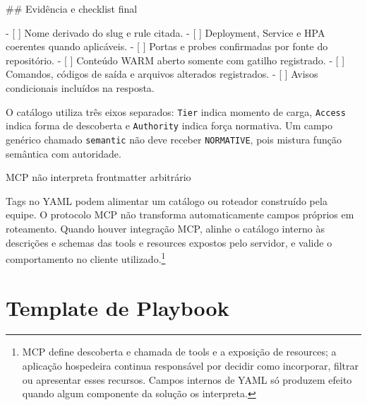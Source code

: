 \documentclass[
  10pt,
  a4paper,
  oneside]{book}
\newenvironment{Shaded}{}{}
\newcommand{\FunctionTok}[1]{\textcolor[rgb]{0.02,0.16,0.49}{#1}}
\newcommand{\NormalTok}[1]{#1}
\newcommand{\SpecialStringTok}[1]{\textcolor[rgb]{0.73,0.40,0.53}{#1}}
\newcommand{\VariableTok}[1]{\textcolor[rgb]{0.10,0.09,0.49}{#1}}
\begin{document}
\begin{Shaded}
\begin{Highlighting}[]
\FunctionTok{\#\# Evidência e checklist final}

\SpecialStringTok{{-} }\VariableTok{[ ]}\NormalTok{ Nome derivado do slug e rule citada.}
\SpecialStringTok{{-} }\VariableTok{[ ]}\NormalTok{ Deployment, Service e HPA coerentes quando aplicáveis.}
\SpecialStringTok{{-} }\VariableTok{[ ]}\NormalTok{ Portas e probes confirmadas por fonte do repositório.}
\SpecialStringTok{{-} }\VariableTok{[ ]}\NormalTok{ Conteúdo WARM aberto somente com gatilho registrado.}
\SpecialStringTok{{-} }\VariableTok{[ ]}\NormalTok{ Comandos, códigos de saída e arquivos alterados registrados.}
\SpecialStringTok{{-} }\VariableTok{[ ]}\NormalTok{ Avisos condicionais incluídos na resposta.}
\end{Highlighting}
\end{Shaded}

O catálogo utiliza três eixos separados: \texttt{Tier} indica momento de
carga, \texttt{Access} indica forma de descoberta e \texttt{Authority}
indica força normativa. Um campo genérico chamado \texttt{semantic} não
deve receber \texttt{NORMATIVE}, pois mistura função semântica com
autoridade.

\begin{warningbox}{MCP não interpreta frontmatter arbitrário}

Tags no YAML podem alimentar um catálogo ou roteador construído pela
equipe. O protocolo MCP não transforma automaticamente campos próprios
em roteamento. Quando houver integração MCP, alinhe o catálogo interno
às descrições e schemas das tools e resources expostos pelo servidor, e
valide o comportamento no cliente utilizado.\footnote{MCP define
  descoberta e chamada de tools e a exposição de resources; a aplicação
  hospedeira continua responsável por decidir como incorporar, filtrar
  ou apresentar esses recursos. Campos internos de YAML só produzem
  efeito quando algum componente da solução os interpreta.}

\end{warningbox}

\hypertarget{template-de-playbook}{%
\section{Template de Playbook}\label{template-de-playbook}}
\end{document}
